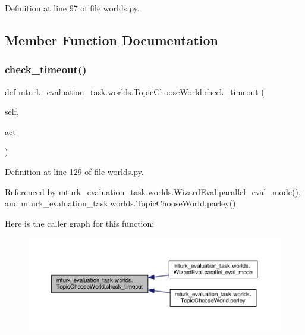 Definition at line 97 of file worlds.\+py.



\subsection{Member Function Documentation}
\mbox{\label{classmturk__evaluation__task_1_1worlds_1_1TopicChooseWorld_ae2708ee0f525591f4d8f3a8028534687}} 
\subsubsection{\texorpdfstring{check\+\_\+timeout()}{check\_timeout()}}
{\footnotesize\ttfamily def mturk\+\_\+evaluation\+\_\+task.\+worlds.\+Topic\+Choose\+World.\+check\+\_\+timeout (\begin{DoxyParamCaption}\item[{}]{self,  }\item[{}]{act }\end{DoxyParamCaption})}



Definition at line 129 of file worlds.\+py.



Referenced by mturk\+\_\+evaluation\+\_\+task.\+worlds.\+Wizard\+Eval.\+parallel\+\_\+eval\+\_\+mode(), and mturk\+\_\+evaluation\+\_\+task.\+worlds.\+Topic\+Choose\+World.\+parley().

Here is the caller graph for this function\+:
\nopagebreak
\begin{figure}[H]
\begin{center}
\leavevmode
\includegraphics[width=350pt]{classmturk__evaluation__task_1_1worlds_1_1TopicChooseWorld_ae2708ee0f525591f4d8f3a8028534687_icgraph}
\end{center}
\end{figure}
\mbox{\label{classmturk__evaluation__task_1_1worlds_1_1TopicChooseWorld_ad31279b796eee33dd196a4f0990a3969}} 
